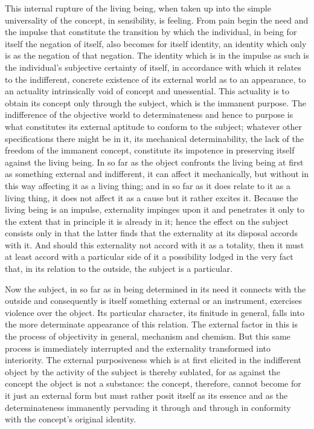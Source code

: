 This internal rupture of the living being,
when taken up into the simple universality of the concept,
in sensibility, is feeling.
From pain begin the need and the impulse
that constitute the transition by which the individual,
in being for itself the negation of itself,
also becomes for itself identity,
an identity which only is as the negation of that negation.
The identity which is in the impulse as such is
the individual's subjective certainty of itself,
in accordance with which it relates to the indifferent,
concrete existence of its external world as to an appearance,
to an actuality intrinsically void of concept and unessential.
This actuality is to obtain its concept
only through the subject,
which is the immanent purpose.
The indifference of the objective world to determinateness
and hence to purpose is what constitutes
its external aptitude to conform to the subject;
whatever other specifications there might be in it,
its mechanical determinability,
the lack of the freedom of the immanent concept,
constitute its impotence in preserving itself against the living being.
In so far as the object confronts the living being
at first as something external and indifferent,
it can affect it mechanically,
but without in this way affecting it as a living thing;
and in so far as it does relate to it as a living thing,
it does not affect it as a cause but it rather excites it.
Because the living being is an impulse,
externality impinges upon it and penetrates it
only to the extent that in principle it is already in it;
hence the effect on the subject consists only in that
the latter finds that the externality at its disposal accords with it.
And should this externality not accord with it as a totality,
then it must at least accord with a particular side of it
a possibility lodged in the very fact that,
in its relation to the outside,
the subject is a particular.

Now the subject, in so far as
in being determined in its need
it connects with the outside
and consequently is itself something external
or an instrument,
exercises violence over the object.
Its particular character, its finitude in general,
falls into the more determinate appearance of this relation.
The external factor in this is the process of
objectivity in general, mechanism and chemism.
But this same process is immediately interrupted
and the externality transformed into interiority.
The external purposiveness which is at first
elicited in the indifferent object
by the activity of the subject
is thereby sublated,
for as against the concept the object is not a substance:
the concept, therefore, cannot become for it just an external form
but must rather posit itself as its essence
and as the determinateness immanently pervading it
through and through in conformity with
the concept's original identity.

